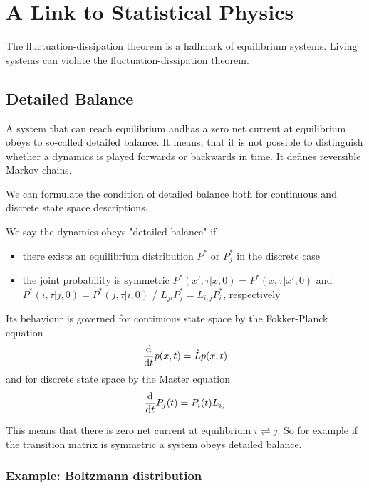 \documentclass{notebook}
\begin{document}
\chapter{A Link to Statistical Physics}

The fluctuation-dissipation theorem is a hallmark of equilibrium systems. Living systems can violate the fluctuation-dissipation theorem. 

\section{Detailed Balance}

A system that can reach equilibrium andhas a zero net current at equilibrium obeys to so-called detailed balance. It means, that it is not possible to distinguish whether a dynamics is played forwards or backwards in time. It defines reversible Markov chains.

We can formulate the condition of detailed balance both for continuous and discrete state space descriptions.

\begin{theorem}
	We say the dynamics obeys "detailed balance" if
	\begin{itemize}
		\item{there exists an equilibrium distribution $P^*$ or $P_j^*$ in the discrete case}
		\item{the joint probability is symmetric $P^*(x', \tau | x, 0) = P^*(x, \tau | x', 0)$ and $P^*(i, \tau | j, 0) = P^*(j, \tau | i, 0)$ / $L_{ji} P_j^* = L_{i,j} P_i^*$, respectively}
	\end{itemize}
	Its behaviour is governed for continuous state space by the Fokker-Planck equation
	\begin{equation}
		\dv{t} p(x,t) = \hat{L} p(x,t)
	\end{equation}
	and for discrete state space by the Master equation
	\begin{equation}
		\dv{t} P_j(t) = P_i(t) L_{ij}
	\end{equation}
\end{theorem}

This means that there is zero net current at equilibrium $i \rightleftharpoons j$. So for example if the transition matrix is symmetric a system obeys detailed balance.

\subsection*{Example: Boltzmann distribution}
\end{document}
